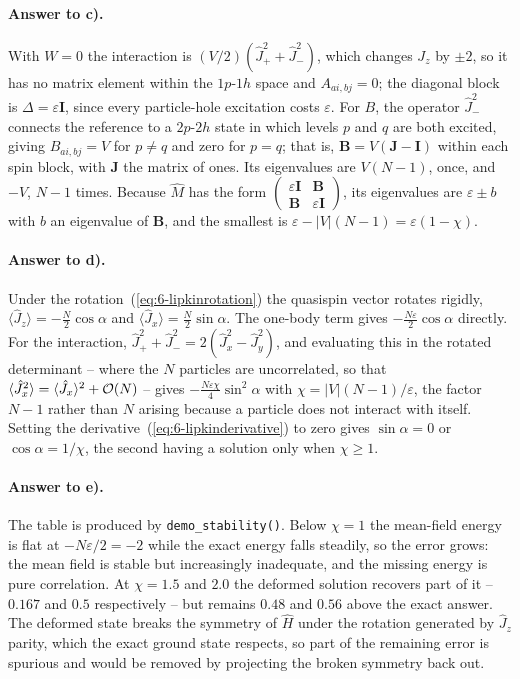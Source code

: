 \paragraph{Answer to c).}
With $W=0$ the interaction is $(V/2)(\hat{J}_+^2+\hat{J}_-^2)$, which changes
$J_z$ by $\pm2$, so it has no matrix element within the $1p$-$1h$ space and
$A_{ai,bj}=0$; the diagonal block is $\Delta=\varepsilon\bm{I}$, since every
particle-hole excitation costs $\varepsilon$.  For $B$, the operator
$\hat{J}_-^2$ connects the reference to a $2p$-$2h$ state in which levels $p$
and $q$ are both excited, giving $B_{ai,bj}=V$ for $p\ne q$ and zero for
$p=q$; that is, $\bm{B}=V(\bm{J}-\bm{I})$ within each spin block, with
$\bm{J}$ the matrix of ones.  Its eigenvalues are $V(N-1)$, once, and $-V$,
$N-1$ times.  Because $\hat{M}$ has the form
$\left(\begin{smallmatrix}\varepsilon\bm{I} & \bm{B}\\ \bm{B} &
\varepsilon\bm{I}\end{smallmatrix}\right)$, its eigenvalues are
$\varepsilon\pm b$ with $b$ an eigenvalue of $\bm{B}$, and the smallest is
$\varepsilon-|V|(N-1)=\varepsilon(1-\chi)$.

\paragraph{Answer to d).}
Under the rotation~(\ref{eq:6-lipkinrotation}) the quasispin vector rotates
rigidly, $\langle\hat{J}_z\rangle=-\tfrac{N}{2}\cos\alpha$ and
$\langle\hat{J}_x\rangle=\tfrac{N}{2}\sin\alpha$.  The one-body term gives
$-\tfrac{N\varepsilon}{2}\cos\alpha$ directly.  For the interaction,
$\hat{J}_+^2+\hat{J}_-^2=2(\hat{J}_x^2-\hat{J}_y^2)$, and evaluating this in
the rotated determinant -- where the $N$ particles are uncorrelated, so that
$\langle\hat{J}_x^2\rangle=\langle\hat{J}_x\rangle^2+\mathcal{O}(N)$ -- gives
$-\tfrac{N\varepsilon\chi}{4}\sin^2\alpha$ with
$\chi=|V|(N-1)/\varepsilon$, the factor $N-1$ rather than $N$ arising because
a particle does not interact with itself.  Setting the
derivative~(\ref{eq:6-lipkinderivative}) to zero gives $\sin\alpha=0$ or
$\cos\alpha=1/\chi$, the second having a solution only when $\chi\ge1$.

\paragraph{Answer to e).}
The table is produced by \texttt{demo\_stability()}.  Below $\chi=1$ the
mean-field energy is flat at $-N\varepsilon/2=-2$ while the exact energy falls
steadily, so the error grows: the mean field is stable but increasingly
inadequate, and the missing energy is pure correlation.  At $\chi=1.5$ and
$2.0$ the deformed solution recovers part of it -- $0.167$ and $0.5$
respectively -- but remains $0.48$ and $0.56$ above the exact answer.  The
deformed state breaks the symmetry of $\hat{H}$ under the rotation generated
by $\hat{J}_z$ parity, which the exact ground state respects, so part of the
remaining error is spurious and would be removed by projecting the broken
symmetry back out.

